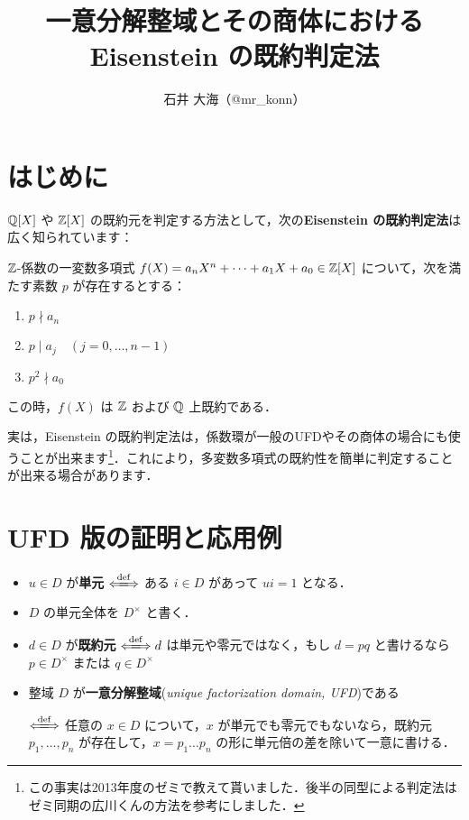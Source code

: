 \documentclass[a4j]{jsarticle}
\title{一意分解整域とその商体における Eisenstein の既約判定法}
\author{石井 大海（@mr\_konn）}
\newcommand{\divs}{ \mid }
\begin{document}
\maketitle

\section{はじめに}
$\mathbb{Q}[X]$ や $\mathbb{Z}[X]$ の既約元を判定する方法として，次の{\bfseries Eisenstein の既約判定法}は広く知られています：

\begin{theorem}
 $\mathbb{Z}$-係数の一変数多項式 $f(X) = a_n X^n + \dots + a_1 X + a_0 \in \mathbb{Z}[X]$ について，次を満たす素数 $p$ が存在するとする：

 \begin{enumerate}[label=(\arabic*)]
  \item $p \nmid a_n$
  \item $p \divs a_j \quad (j = 0, \dots, n-1)$
  \item $p^2 \nmid a_0$
 \end{enumerate}

 この時，$f(X)$ は $\mathbb{Z}$ および $\mathbb{Q}$ 上既約である．
\end{theorem}

実は，Eisenstein の既約判定法は，係数環が一般のUFDやその商体の場合にも使うことが出来ます\footnote{この事実は2013年度のゼミで教えて貰いました．後半の同型による判定法はゼミ同期の広川くんの方法を参考にしました．}．これにより，多変数多項式の既約性を簡単に判定することが出来る場合があります．

\section{UFD 版の証明と応用例}

\begin{definition}
 \begin{itemize}
  \item $u \in D$ が{\bfseries 単元} $\defs$ ある $i \in D$ があって $ui = 1$ となる．
  \item $D$ の単元全体を $D^\times$ と書く．
  \item $d \in D$ が{\bfseries 既約元} $\defs d $ は単元や零元ではなく，もし $d = pq$ と書けるなら $p \in D^\times$ または $q \in D^\times$
  \item 整域 $D$ が{\bfseries 一意分解整域}({\itshape unique factorization domain, UFD})である

  $\defs$ 任意の $x \in D$ について，$x$ が単元でも零元でもないなら，既約元 $p_1, \dots, p_n$ が存在して，$x = p_1 \dots p_n$ の形に単元倍の差を除いて一意に書ける．
 \end{itemize}
\end{definition}
\end{document}
